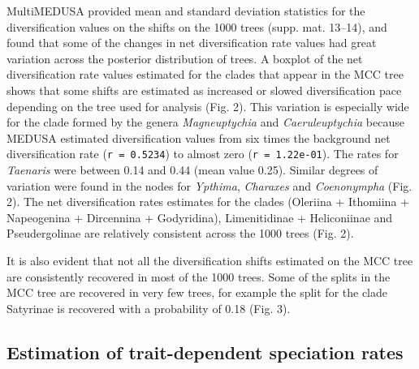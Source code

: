 \documentclass[10pt]{article}
\begin{document}
MultiMEDUSA provided mean and standard deviation statistics for the
diversification values on the shifts on the 1000 trees (supp. mat.
13--14), and found that some of the changes in net diversification rate
values had great variation across the posterior distribution of trees. A
boxplot of the net diversification rate values estimated for the clades
that appear in the MCC tree shows that some shifts are estimated as
increased or slowed diversification pace depending on the tree used for
analysis (Fig. 2). This variation is especially wide for the clade
formed by the genera \emph{Magneuptychia} and \emph{Caeruleuptychia}
because MEDUSA estimated diversification values from six times the
background net diversification rate (\texttt{r = 0.5234}) to almost zero
(\texttt{r = 1.22e-01}). The rates for \emph{Taenaris} were between 0.14
and 0.44 (mean value 0.25). Similar degrees of variation were found in
the nodes for \emph{Ypthima}, \emph{Charaxes} and \emph{Coenonympha}
(Fig. 2). The net diversification rates estimates for the clades
(Oleriina + Ithomiina + Napeogenina + Dircennina + Godyridina),
Limenitidinae + Heliconiinae and Pseudergolinae are relatively
consistent across the 1000 trees (Fig. 2).

It is also evident that not all the diversification shifts estimated on
the MCC tree are consistently recovered in most of the 1000 trees. Some
of the splits in the MCC tree are recovered in very few trees, for
example the split for the clade Satyrinae is recovered with a probability
of 0.18 (Fig. 3).

\subsection*{Estimation of trait-dependent speciation
rates}
\end{document}
